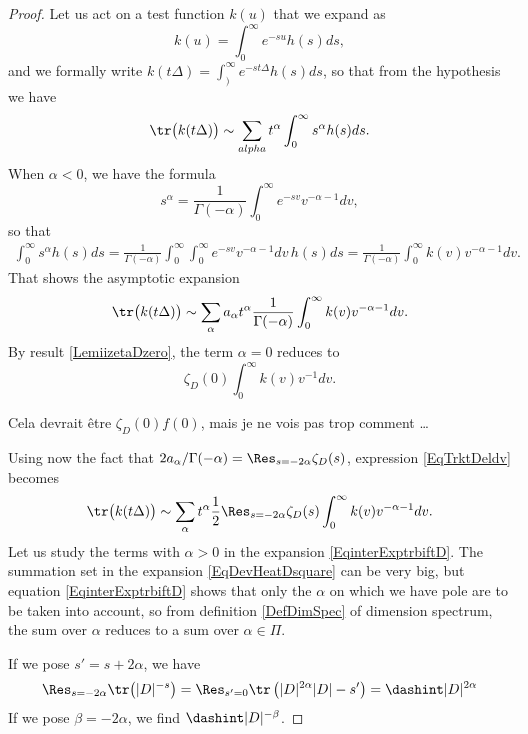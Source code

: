\begin{proof}
Let us act on a test function $k(u)$ that we expand as
\[ 
  k(u)=\int_0^{\infty} e^{-su}h(s)ds,
\]
and we formally write $k(t\Delta)=\int_)^{\infty} e^{-st\Delta}h(s)ds$, so that from the hypothesis we have
\begin{equation}
\tr\big( k(t\Delta) \big)\sim \sum_{alpha}t^{\alpha}\int_0^\infty s^{\alpha}h(s)ds.
\end{equation}
When $\alpha<0$, we have the formula
\[ 
  s^{\alpha}=\frac{1}{ \Gamma(-\alpha) }\int_0^{\infty} e^{-sv}v^{-\alpha-1}dv,
\]
so that
\begin{align*}
\int_0^{\infty}s^{\alpha}h(s)ds	=\frac{1}{ \Gamma(-\alpha) }\int_0^{\infty}\int_0^{\infty} e^{-sv}v^{-\alpha-1}dv\,h(s)ds
				=\frac{1}{ \Gamma(-\alpha) }\int_0^{\infty}k(v)v^{-\alpha-1}dv.
\end{align*}
That shows the asymptotic expansion 
\begin{equation}		\label{EqTrktDeldv}
\tr\big( k(t\Delta) \big)\sim \sum_{\alpha}a_{\alpha}t^{\alpha}\frac{1}{ \Gamma(-\alpha) }\int_0^{\infty}k(v)v^{-\alpha-1}dv.
\end{equation}
By result \eqref{LemiizetaDzero}, the term $\alpha=0$ reduces to
\[ 
  \zeta_D(0)\int_0^{\infty}k(v)v^{-1}dv.
\]
\begin{probleme}
Cela devrait être $\zeta_D(0)f(0)$, mais je ne vois pas trop comment \ldots
\end{probleme}
Using now the fact that $2 a_{\alpha}/\Gamma(-\alpha)=\Res_{s=-2\alpha}\zeta_D(s)$, expression \eqref{EqTrktDeldv} becomes
\begin{equation}		\label{EqinterExptrbiftD}
  \tr\big( k(t\Delta) \big)\sim \sum_{\alpha}t^{\alpha}\frac{ 1 }{2}\Res_{s=-2\alpha}\zeta_D(s)\int_0^{\infty}k(v)v^{-\alpha-1}dv.
\end{equation}
Let us study the terms with $\alpha>0$ in the expansion \eqref{EqinterExptrbiftD}. The summation set in the expansion \eqref{EqDevHeatDsquare} can be very big, but equation \eqref{EqinterExptrbiftD} shows that only the $\alpha$ on which we have pole are to be taken into account, so from definition \ref{DefDimSpec} of dimension spectrum, the sum over $\alpha$ reduces to a sum over $\alpha\in\Pi$. 

If we pose $s'=s+2\alpha$, we have
\[ 
  \Res_{s=-2\alpha}\tr\big( | D |^{-s} \big)=\Res_{s'=0}\tr\left( | D |^{2\alpha}| D |-s' \right)=\dashint| D |^{2\alpha}
\]
If we pose $\beta=-2\alpha$, we find $\dashint| D |^{-\beta}$. 

\end{proof}

